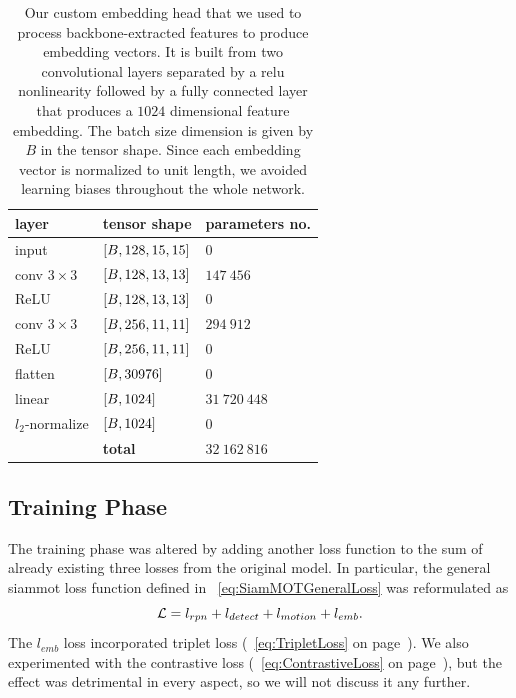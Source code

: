 \begin{table}[!t]
    \centering
    \begin{tabular}{lll}
        \toprule
        \textbf{layer}    & \textbf{tensor shape}        & \textbf{parameters no.} \\
        \midrule
        input             & $\left[ {B, 128, 15, 15} \right]$ & $0$                     \\
        \midrule
        conv $3 \times 3$ & $\left[ {B, 128, 13, 13} \right]$ & $147\ 456$              \\
        ReLU              & $\left[ {B, 128, 13, 13} \right]$ & $0$                     \\
        \midrule
        conv $3 \times 3$ & $\left[ {B, 256, 11, 11} \right]$ & $294\ 912$              \\
        ReLU              & $\left[ {B, 256, 11, 11} \right]$ & $0$                     \\
        \midrule
        flatten           & $\left[ {B, 30976} \right]$       & $0$                     \\
        linear            & $\left[ {B, 1024} \right]$        & $31\ 720\ 448$          \\
        \midrule
        $l_2$-normalize   & $\left[ {B, 1024} \right]$        & $0$                     \\
        \bottomrule
                          & \textbf{total}               & $32\ 162\ 816$          \\
        \cline{2-3}
    \end{tabular}
    \caption[Feature embedding head]{Our custom embedding head that we used to process backbone-extracted features to produce embedding vectors. It is built from two convolutional layers separated by a \gls{relu} nonlinearity followed by a fully connected layer that produces a $1024$ dimensional feature embedding. The batch size dimension is given by $B$ in the tensor shape. Since each embedding vector is normalized to unit length, we avoided learning biases throughout the whole network.}
    \label{tab:FeatureEmbeddingHead}
\end{table}

\subsection{Training Phase}

The training phase was altered by adding another loss function to the sum of already existing three losses from the original model. In particular, the general \gls{siammot} loss function defined in \eqtext{}~\ref{eq:SiamMOTGeneralLoss} was reformulated as
\begin{equation}
    \label{eq:SiamMOTFeatureEmbLoss}
    \mathcal{L} = l_{rpn} + l_{detect} + l_{motion} + l_{emb}.
\end{equation}
The $l_{emb}$ loss incorporated triplet loss (\eqtext{}~\ref{eq:TripletLoss} on page~\pageref{eq:TripletLoss}). We also experimented with the contrastive loss (\eqtext{}~\ref{eq:ContrastiveLoss} on page~\pageref{eq:ContrastiveLoss}), but the effect was detrimental in every aspect, so we will not discuss it any further.

